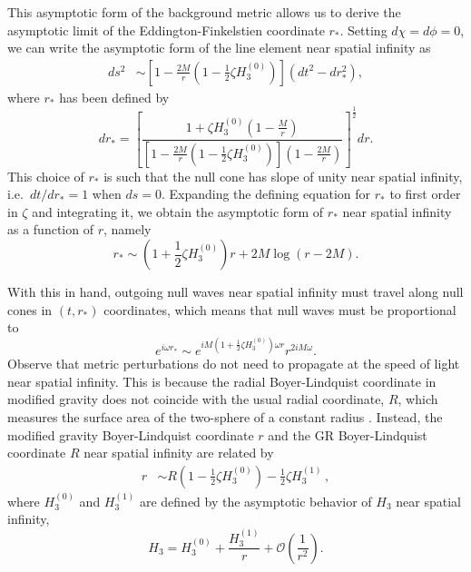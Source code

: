 \documentclass[aps,prx,amsmath,floats,floatfix,twocolumn,
  superscriptaddress,nofootinbib,showpacs]{revtex4-1}
\begin{document}
This asymptotic form of the background metric allows us to derive the asymptotic limit of the Eddington-Finkelstien coordinate $r_*$. Setting $d \chi = d \phi = 0 $, we can write the asymptotic form of the line element near spatial infinity as
\begin{equation}\label{eq:EF_coord_inf}
\begin{split}
ds^2 & \sim  \left[1-\frac{2M}{r} \left( 1 - \frac{1}{2} \zeta H_3^{(0)} \right) \right] \left( dt^2 - d r_*^2 \right), 
\end{split}
\end{equation}
where $r_*$ has been defined by 
\begin{equation}
dr_* = \left[ \frac{1 + \zeta H_3^{(0)} \left( 1 - \frac{M}{r} \right)}{\left[1-\frac{2M}{r} \left( 1 - \frac{1}{2} \zeta H_3^{(0)} \right) \right] \left(1-\frac{2M}{r}\right)} \right]^{\frac{1}{2}} dr. 
\end{equation}
This choice of $r_*$ is such that the null cone has slope of unity near spatial infinity, i.e.~$dt/dr_* = 1$ when $ds = 0$. 
Expanding the defining equation for $r_*$ to first order in $\zeta$ and integrating it, we obtain the asymptotic form of $r_*$ near spatial infinity as a function of $r$, namely
\begin{equation}
r_* \sim \left( 1 + \frac{1}{2} \zeta H_3^{(0)} \right) r + 2 M \log \left( r - 2M \right). 
\end{equation}

With this in hand, outgoing null waves near spatial infinity must travel along null cones in $(t,r_*)$ coordinates, which means that null waves must be proportional to
\begin{equation}
e^{i \omega r_*} \sim e^{i M (1+\frac{1}{2} \zeta H_3^{(0)}) \omega r} r^{2iM\omega}. 
\end{equation}
Observe that metric perturbations do not need to propagate at the speed of light near spatial infinity.
This is because the radial Boyer-Lindquist coordinate in modified gravity does not coincide with the usual radial coordinate, $R$, which measures the surface area of the two-sphere of a constant radius \cite{Cano_Ruiperez_2019}. 
Instead, the modified gravity Boyer-Lindquist coordinate $r$ and the GR Boyer-Lindquist coordinate $R$ near spatial infinity are related by 
\begin{equation}\label{eq:radial_coordinate_limit}
\begin{split}
r & \sim R \left(1 - \frac{1}{2} \zeta H_3^{(0)} \right) -  \frac{1}{2} \zeta H_3^{(1)}\,,  
\end{split}
\end{equation}
where $H_3^{(0)}$ and $H_3^{(1)}$ are defined by the asymptotic behavior of $H_3$ near spatial infinity, 
\begin{equation}
H_3 = H_3^{(0)} + \frac{H_3^{(1)}}{r} + \mathcal{O} \left( \frac{1}{r^2}\right). 
\end{equation}
\end{document}
